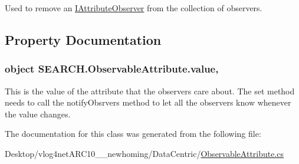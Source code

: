 Used to remove an \hyperlink{interface_s_e_a_r_c_h_1_1_i_attribute_observer}{I\-Attribute\-Observer} from the collection of observers. 



\subsection{Property Documentation}
\hypertarget{class_s_e_a_r_c_h_1_1_observable_attribute_a3a39d840a48304dfb72a26132e402f06}{
\subsubsection[{value}]{\setlength{\rightskip}{0pt plus 5cm}object S\-E\-A\-R\-C\-H.\-Observable\-Attribute.\-value\hspace{0.3cm}{\ttfamily [get]}, {\ttfamily [set]}}}\label{class_s_e_a_r_c_h_1_1_observable_attribute_a3a39d840a48304dfb72a26132e402f06}


This is the value of the attribute that the observers care about. The set method needs to call the notify\-Obsrvers method to let all the observers know whenever the value changes. 



The documentation for this class was generated from the following file\-:\begin{DoxyCompactItemize}
\item 
Desktop/vlog4net\-A\-R\-C10\-\_\-\_\-newhoming/\-Data\-Centric/\hyperlink{_observable_attribute_8cs}{Observable\-Attribute.\-cs}\end{DoxyCompactItemize}
